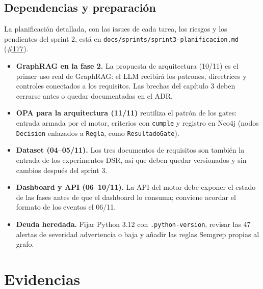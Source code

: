 \documentclass[11pt,a4paper]{report}
\newcommand{\pr}[1]{\href{https://github.com/PracticasESPE/Framework_Desarrollo_Seguro/pull/#1}{\##1}}
\begin{document}
\section{Dependencias y preparación}

La planificación detallada, con las issues de cada tarea, los riesgos y los pendientes del sprint
2, está en \texttt{docs/sprints/sprint3-planificacion.md} (\pr{177}).

\begin{itemize}
\item \textbf{GraphRAG en la fase 2.} La propuesta de arquitectura (10/11) es el primer uso real
de GraphRAG: el LLM recibirá los patrones, directrices y controles conectados a los requisitos.
Las brechas del capítulo 3 deben cerrarse antes o quedar documentadas en el ADR.
\item \textbf{OPA para la arquitectura (11/11)} reutiliza el patrón de los gates: entrada armada
por el motor, criterios con \texttt{cumple} y registro en Neo4j (nodos \texttt{Decision} enlazados
a \texttt{Regla}, como \texttt{ResultadoGate}).
\item \textbf{Dataset (04--05/11).} Los tres documentos de requisitos son también la entrada de
los experimentos DSR, así que deben quedar versionados y sin cambios después del sprint 3.
\item \textbf{Dashboard y API (06--10/11).} La API del motor debe exponer el estado de las fases
antes de que el dashboard lo consuma; conviene acordar el formato de los eventos el 06/11.
\item \textbf{Deuda heredada.} Fijar Python 3.12 con \texttt{.python-version}, revisar las 47
alertas de severidad advertencia o baja y añadir las reglas Semgrep propias al grafo.
\end{itemize}

\appendix
\chapter{Evidencias}
\end{document}

